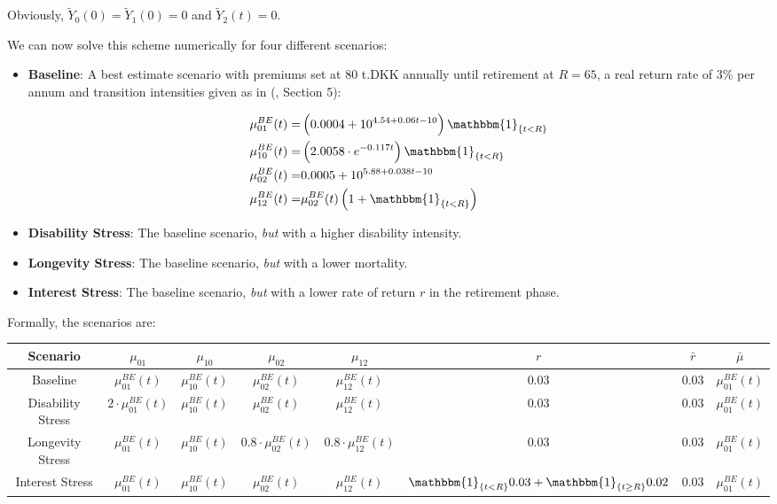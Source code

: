 \documentclass{book}
\newcommand{\1}[1]{\mathbbm{1}_{\left\lbrace #1 \right\rbrace}}
\theoremstyle{break}
\theoremstyle{remark}
\numberwithin{equation}{section}
\begin{document}
Obviously, $\tilde{Y}_0(0)=\tilde{Y}_1(0)=0$ and $\tilde{Y}_2(t)=0$.

We can now solve this scheme numerically for four different scenarios:

\begin{itemize}
	\item \textbf{Baseline}: A best estimate scenario with premiums set at 80 t.DKK annually until retirement at $R=65$, a real return rate of 3\% per annum and transition intensities given as in (\cite{BuchartMoller}, Section 5):
	
	\begin{align*}
		\mu_{01}^{BE}(t) =& \left(0.0004 + 10^{4.54 + 0.06t - 10}\right) \1{t<R} \\
		\mu_{10}^{BE}(t) =& \left(2.0058 \cdot e^{-0.117t}\right) \1{t<R} \\
		\mu_{02}^{BE}(t) =& 0.0005 + 10^{5.88 + 0.038t - 10} \\
		\mu_{12}^{BE}(t) =& \mu_{02}^{BE}(t) \left( 1 + \1{t<R} \right)
	\end{align*}
	
	\item \textbf{Disability Stress}: The baseline scenario, \textit{but} with a higher disability intensity.
	\item \textbf{Longevity Stress}: The baseline scenario, \textit{but} with a lower mortality.
	\item \textbf{Interest Stress}: The baseline scenario, \textit{but} with a lower rate of return $r$ in the retirement phase.
\end{itemize}

Formally, the scenarios are:

\begin{center}
	\begin{tabular}{ |c|c|c|c|c|c|c|c| }
		\hline
		Scenario & $\mu_{01}$ & $\mu_{10}$ & $\mu_{02}$ & $\mu_{12}$ & $r$ & $\bar{r}$ & $\bar{\mu}$ \\
		\hline
		Baseline & $\mu_{01}^{BE}(t)$ & $\mu_{10}^{BE}(t)$ & $\mu_{02}^{BE}(t)$ &$\mu_{12}^{BE}(t)$ & 0.03 & 0.03 & $\mu_{01}^{BE}(t)$ \\
		Disability Stress & $2 \cdot \mu_{01}^{BE}(t)$ & $\mu_{10}^{BE}(t)$ & $\mu_{02}^{BE}(t)$ & $\mu_{12}^{BE}(t)$ & 0.03 & 0.03 & $\mu_{01}^{BE}(t)$ \\
		Longevity Stress & $\mu_{01}^{BE}(t)$ & $\mu_{10}^{BE}(t)$ & $0.8 \cdot \mu_{02}^{BE}(t)$ & $0.8 \cdot \mu_{12}^{BE}(t)$ & 0.03 & 0.03 & $\mu_{01}^{BE}(t)$ \\
		Interest Stress & $\mu_{01}^{BE}(t)$ & $\mu_{10}^{BE}(t)$ & $\mu_{02}^{BE}(t)$ & $\mu_{12}^{BE}(t)$ & $\1{t < R} 0.03 + \1{t \geq R} 0.02$ & 0.03 & $\mu_{01}^{BE}(t)$ \\
		\hline
	\end{tabular}
\end{center}
\end{document}
